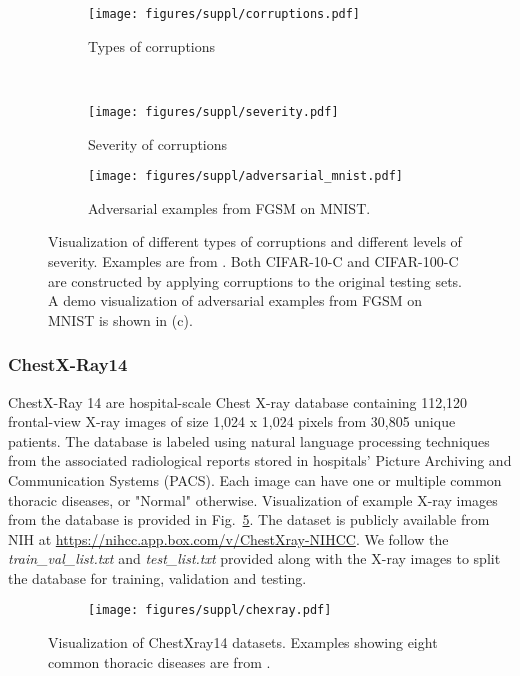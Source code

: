 \documentclass[journal]{IEEEtran}
\theoremstyle{definition}
\theoremstyle{remark}
\begin{document}
\begin{figure}[!htbp]
	\centering
	\begin{subfigure}[t]{.48\textwidth}
		\centering
		\texttt{[image: figures/suppl/corruptions.pdf]}
		\caption{Types of corruptions\label{fig:corruptions}}
	\end{subfigure}\\ \vspace{3mm}
	\begin{subfigure}[t]{.48\textwidth}
		\centering
		\texttt{[image: figures/suppl/severity.pdf]}
		\caption{Severity of corruptions\label{fig:severity}}
	\end{subfigure}
	\begin{subfigure}[t]{.48\textwidth}
		\centering
		\texttt{[image: figures/suppl/adversarial\_mnist.pdf]}
		\caption{Adversarial examples from FGSM \cite{goodfellow2014explaining} on MNIST.\label{fig:adversarial_mnist}}
	\end{subfigure}
	\caption{Visualization of different types of corruptions and different levels of severity. Examples are from \cite{hendrycks2018benchmarking}. Both CIFAR-10-C and CIFAR-100-C are constructed by applying corruptions to the original testing sets. A demo visualization of adversarial examples from FGSM on MNIST is shown in (c).
	\label{fig:cifar-c}}
\end{figure}

\subsubsection{ChestX-Ray14}
ChestX-Ray 14 are hospital-scale Chest X-ray database containing 112,120 frontal-view X-ray images of size 1,024 x 1,024 pixels from 30,805 unique patients. The database is labeled using natural language processing techniques from the associated radiological reports stored in hospitals' Picture Archiving and Communication Systems (PACS). Each image can have one or multiple common thoracic diseases, or "Normal" otherwise. Visualization of example X-ray images from the database is provided in Fig.~\ref{fig:chexray}. The dataset is publicly available from NIH at {\color{red} \url{https://nihcc.app.box.com/v/ChestXray-NIHCC}}. We follow the \emph{train_val_list.txt} and \emph{test_list.txt} provided along with the X-ray images to split the database for training, validation and testing.

\begin{figure}[!htbp]
	\centering
	\begin{subfigure}[t]{.48\textwidth}
		\centering
		\texttt{[image: figures/suppl/chexray.pdf]}
	\end{subfigure}
	\caption{Visualization of ChestXray14 datasets. Examples showing eight common thoracic diseases are from \cite{wang2017chestx}.
	\label{fig:chexray}}
\end{figure}
\end{document}

